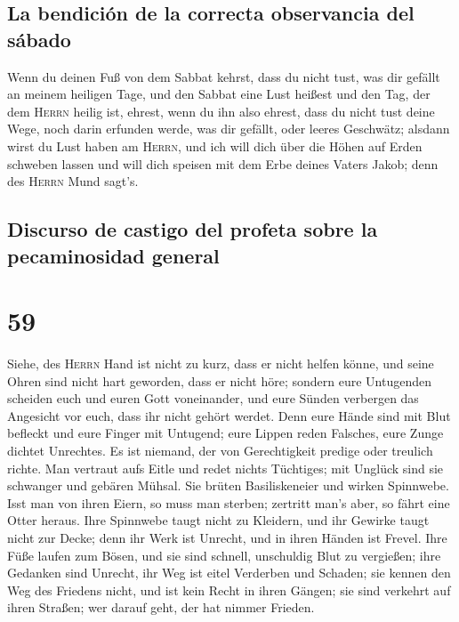 \hypertarget{la-bendiciuxf3n-de-la-correcta-observancia-del-suxe1bado}{%
\subsection{La bendición de la correcta observancia del
sábado}\label{la-bendiciuxf3n-de-la-correcta-observancia-del-suxe1bado}}

 Wenn du deinen Fuß von dem Sabbat kehrst, dass du nicht
tust, was dir gefällt an meinem heiligen Tage, und den Sabbat eine Lust
heißest und den Tag, der dem \textsc{Herrn} heilig ist, ehrest, wenn du
ihn also ehrest, dass du nicht tust deine Wege, noch darin erfunden
werde, was dir gefällt, oder leeres Geschwätz;  alsdann
wirst du Lust haben am \textsc{Herrn}, und ich will dich über die Höhen
auf Erden schweben lassen und will dich speisen mit dem Erbe deines
Vaters Jakob; denn des \textsc{Herrn} Mund sagt's.

\hypertarget{discurso-de-castigo-del-profeta-sobre-la-pecaminosidad-general}{%
\subsection{Discurso de castigo del profeta sobre la pecaminosidad
general}\label{discurso-de-castigo-del-profeta-sobre-la-pecaminosidad-general}}

\hypertarget{section-58}{%
\section{59}\label{section-58}}

 Siehe, des \textsc{Herrn} Hand ist nicht zu kurz, dass er
nicht helfen könne, und seine Ohren sind nicht hart geworden, dass er
nicht höre;  sondern eure Untugenden scheiden euch und
euren Gott voneinander, und eure Sünden verbergen das Angesicht vor
euch, dass ihr nicht gehört werdet.  Denn eure Hände sind
mit Blut befleckt und eure Finger mit Untugend; eure Lippen reden
Falsches, eure Zunge dichtet Unrechtes.  Es ist niemand,
der von Gerechtigkeit predige oder treulich richte. Man vertraut aufs
Eitle und redet nichts Tüchtiges; mit Unglück sind sie schwanger und
gebären Mühsal.  Sie brüten Basiliskeneier und wirken
Spinnwebe. Isst man von ihren Eiern, so muss man sterben; zertritt man's
aber, so fährt eine Otter heraus.  Ihre Spinnwebe taugt
nicht zu Kleidern, und ihr Gewirke taugt nicht zur Decke; denn ihr Werk
ist Unrecht, und in ihren Händen ist Frevel.  Ihre Füße
laufen zum Bösen, und sie sind schnell, unschuldig Blut zu vergießen;
ihre Gedanken sind Unrecht, ihr Weg ist eitel Verderben und Schaden;
 sie kennen den Weg des Friedens nicht, und ist kein Recht
in ihren Gängen; sie sind verkehrt auf ihren Straßen; wer darauf geht,
der hat nimmer Frieden.

